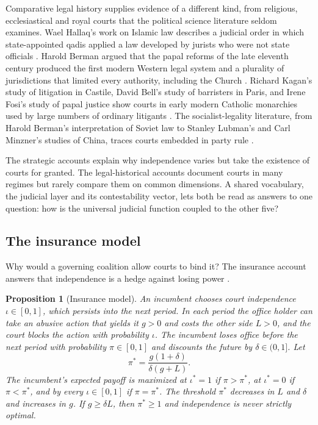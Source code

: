 \documentclass[11pt,letterpaper]{article}
\newtheorem{proposition}[theorem]{Proposition}
\theoremstyle{definition}
\theoremstyle{remark}
\begin{document}
Comparative legal history supplies evidence of a different kind, from religious, ecclesiastical and royal courts that the political science literature seldom examines. Wael Hallaq's work on Islamic law describes a judicial order in which state-appointed qadis applied a law developed by jurists who were not state officials \citep{hallaq2005,hallaq2009}. Harold Berman argued that the papal reforms of the late eleventh century produced the first modern Western legal system and a plurality of jurisdictions that limited every authority, including the Church \citep{berman1983}. Richard Kagan's study of litigation in Castile, David Bell's study of barristers in Paris, and Irene Fosi's study of papal justice show courts in early modern Catholic monarchies used by large numbers of ordinary litigants \citep{kagan1981,bell1994,fosi2011}. The socialist-legality literature, from Harold Berman's interpretation of Soviet law to Stanley Lubman's and Carl Minzner's studies of China, traces courts embedded in party rule \citep{berman1963,lubman1999,minzner2011}.

The strategic accounts explain why independence varies but take the existence of courts for granted. The legal-historical accounts document courts in many regimes but rarely compare them on common dimensions. A shared vocabulary, the judicial layer and its contestability vector, lets both be read as answers to one question: how is the universal judicial function coupled to the other five?

\subsection{The insurance model}

Why would a governing coalition allow courts to bind it? The insurance account answers that independence is a hedge against losing power \citep{landes1975,ramseyer1994,stephenson2003}.

\begin{proposition}[Insurance model]
\label{prop:judicial-power:insurance}
An incumbent chooses court independence $\iota\in[0,1]$, which persists into the next period. In each period the office holder can take an abusive action that yields it $g>0$ and costs the other side $L>0$, and the court blocks the action with probability $\iota$. The incumbent loses office before the next period with probability $\pi\in[0,1]$ and discounts the future by $\delta\in(0,1]$. Let
\[
\pi^{*}=\frac{g(1+\delta)}{\delta(g+L)}.
\]
The incumbent's expected payoff is maximized at $\iota^{*}=1$ if $\pi>\pi^{*}$, at $\iota^{*}=0$ if $\pi<\pi^{*}$, and by every $\iota\in[0,1]$ if $\pi=\pi^{*}$. The threshold $\pi^{*}$ decreases in $L$ and $\delta$ and increases in $g$. If $g\ge\delta L$, then $\pi^{*}\ge 1$ and independence is never strictly optimal.
\end{proposition}
\end{document}
